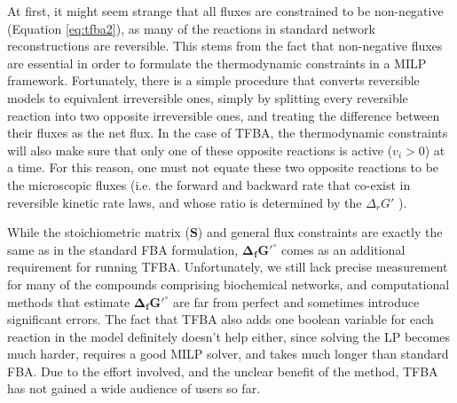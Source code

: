 \documentclass[twocolumn]{bmcart}%
\begin{document}
At first, it might seem strange that all fluxes are constrained to be non-negative (Equation \ref{eq:tfba2}), as many of the reactions in standard network reconstructions are reversible. This stems from the fact that non-negative fluxes are essential in order to formulate the thermodynamic constraints in a MILP framework. Fortunately, there is a simple procedure that converts reversible models to equivalent irreversible ones, simply by splitting every reversible reaction into two opposite irreversible ones, and treating the difference between their fluxes as the net flux. In the case of TFBA, the thermodynamic constraints will also make sure that only one of these opposite reactions is active ($v_i > 0$) at a time. For this reason, one must not equate these two opposite reactions to be the microscopic fluxes (i.e. the forward and backward rate that co-exist in reversible kinetic rate laws, and whose ratio is determined by the $\Delta_r G'$ \cite{Beard2007-kp}). 

While the stoichiometric matrix ($\mathbf{S}$) and general flux constraints are exactly the same as in the standard FBA formulation, $\mathbf{\Delta_f G'^\circ}$ comes as an additional requirement for running TFBA. Unfortunately, we still lack precise measurement for many of the compounds comprising biochemical networks, and computational methods that estimate $\mathbf{\Delta_f G'^\circ}$ \cite{Jankowski2008-hd,Noor2012-mp,Noor2013-an,Jinich2014-nv} are far from perfect and sometimes introduce significant errors. The fact that TFBA also adds one boolean variable for each reaction in the model definitely doesn't help either, since solving the LP becomes much harder, requires a good MILP solver, and takes much longer than standard FBA. Due to the effort involved, and the unclear benefit of the method, TFBA has not gained a wide audience of users so far.
\end{document}
